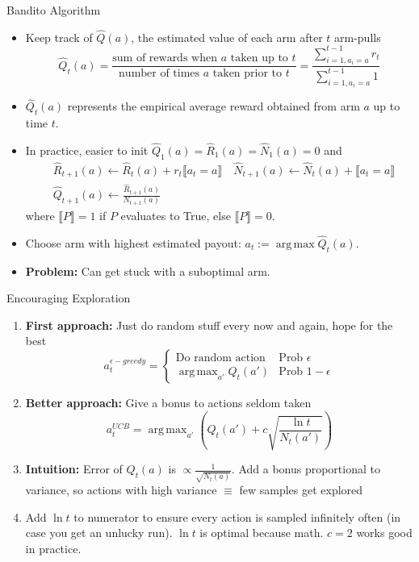 \documentclass[10pt,a4paper, handout]{beamer}
\DeclareMathOperator*{\argmax}{arg\,max}
\newcommand{\iver}[1]{\llbracket  {#1} \rrbracket}
\begin{document}
\begin{frame}{Bandito Algorithm}
	\begin{itemize}
		\item Keep track of $\hat{Q}(a)$, the estimated value of each arm
		after $t$ arm-pulls
		$$
		\hat{Q}_t(a) = \frac{\text{sum of rewards when $a$ taken up to $t$}}
		{\text{number of times $a$ taken prior to $t$}}
		= \frac{\sum_{i=1, a_i=a}^{t-1} r_t  }{\sum_{i=1,a_i=a}^{t-1} 1} 
		$$
		\pause 
		\item
		$\hat{Q}_t(a)$ represents the empirical average reward obtained from arm $a$
		up to time $t$. 
		\pause 
		\item In practice, easier to init 
		$\hat{Q}_1(a) = \hat{R}_1(a) = \hat{N}_1(a) = 0$ and
		\begin{align*}
			&\hat{R}_{t+1}(a) \leftarrow \hat{R}_{t}(a) + r_t \iver{a_t=a} 
		\quad \hat{N}_{t+1}(a) \leftarrow \hat{N}_{t}(a) + \iver{a_t=a} \\
		& \hat{Q}_{t+1}(a) \leftarrow \frac{\hat{R}_{t+1}(a)}{N_{t+1}(a)}
		\end{align*}
	where $\iver{P} = 1$ if $P$ evaluates to True, else $\iver{P}=0$.
	\pause 
	\item Choose arm with highest estimated payout: $a_t := \argmax \hat{Q}_t(a)$.
	\pause
	\item \textbf{Problem:} Can get stuck with a suboptimal arm.
	\end{itemize}
\end{frame}

\begin{frame}{Encouraging Exploration}
	\begin{enumerate}
		\item \textbf{First approach:} Just do random stuff every now and 
		again, hope for the best
		$$
		a^{\epsilon-greedy}_t = \begin{cases}
			\text{Do random action} & \text{Prob } \epsilon \\
			\argmax_{a'} Q_t(a') & \text{Prob } 1-\epsilon 
		\end{cases}
		$$
		\pause
		\item \textbf{Better approach:} Give a bonus to actions seldom taken
		$$
		a^{UCB}_t = \argmax_{a'}
		\left( 
		Q_t(a') + c \sqrt{\frac{\ln t}{N_t(a')}}
		\right)
		$$
		\pause
		\item \textbf{Intuition:} Error of
		$Q_t(a)$ is  $\propto \frac{1}{\sqrt{N_t(a)}}$. Add a bonus proportional to variance,
		so actions with high variance $\equiv$ few samples get explored
		\pause
		\item Add $\ln t$ to numerator to ensure every action is sampled
		infinitely often (in case you get an unlucky run). $\ln t$ is optimal
		because math. $c=2$ works good in practice.
	\end{enumerate}
	
\end{frame}
\end{document}
